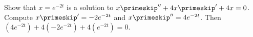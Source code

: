 {Show that $x = e^{-2t}$ is a solution to $x\primeskip'' + 4x\primeskip' + 4x = 0$.}
{Compute $x\primeskip' = -2e^{-2t}$ and $x\primeskip'' = 4e^{-2t}$.  Then
$(4e^{-2t}) + 4 (-2e^{-2t}) + 4 (e^{-2t}) = 0$.}